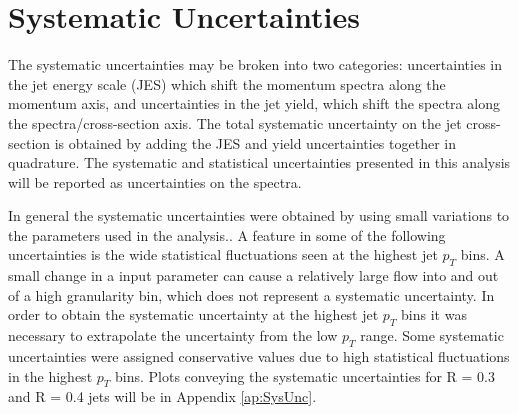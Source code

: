 
\section{Systematic Uncertainties}

The systematic uncertainties may be broken into two categories: uncertainties in the jet energy scale (JES) which shift the momentum spectra along the momentum axis, and uncertainties in the jet yield, which shift the spectra along the spectra/cross-section axis.  The total systematic uncertainty on the jet cross-section is obtained by adding the JES and yield uncertainties together in quadrature.  The systematic and statistical uncertainties presented in this analysis will be reported as uncertainties on the spectra.  

In general the systematic uncertainties were obtained by using small variations to the parameters used in the analysis..  A feature in some of the following uncertainties is the wide statistical fluctuations seen at the highest jet $p_{T}$ bins.  A small change in a input parameter can cause a relatively large flow into and out of a high granularity bin, which does not represent a systematic uncertainty.  In order to obtain the systematic uncertainty at the highest jet $p_{T}$ bins it was necessary to extrapolate the uncertainty from the low $p_{T}$ range.  Some systematic uncertainties were assigned conservative values due to high statistical fluctuations in the highest $p_{T}$ bins.  Plots conveying the systematic uncertainties for R = 0.3 and R = 0.4 jets will be in Appendix \ref{ap:SysUnc}.

